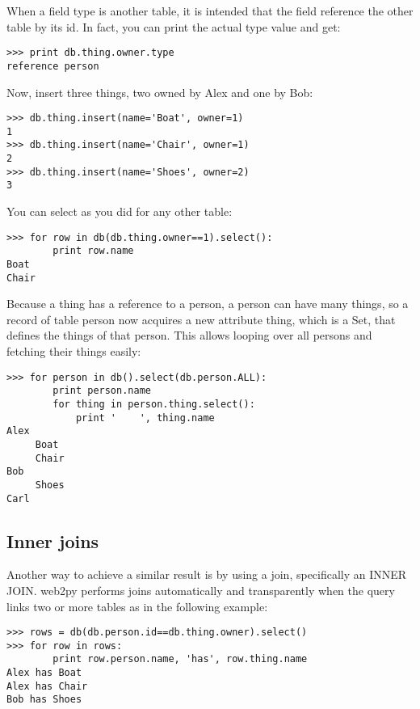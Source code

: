 \documentclass[justified,sixbynine,notoc]{tufte-book}
\def\inxx#1{\index{#1}}
\begin{document}
\begin{fullwidth}
When a field type is another table, it is intended that the field reference the other table by its id. In fact, you can print the actual type value and get:
\begin{lstlisting}
>>> print db.thing.owner.type
reference person
\end{lstlisting}

Now, insert three things, two owned by Alex and one by Bob:
\begin{lstlisting}
>>> db.thing.insert(name='Boat', owner=1)
1
>>> db.thing.insert(name='Chair', owner=1)
2
>>> db.thing.insert(name='Shoes', owner=2)
3
\end{lstlisting}

You can select as you did for any other table:
\begin{lstlisting}
>>> for row in db(db.thing.owner==1).select():
        print row.name
Boat
Chair
\end{lstlisting}

Because a thing has a reference to a person, a person can have many things, so a record of table person now acquires a new attribute thing, which is a Set, that defines the things of that person. This allows looping over all persons and fetching their things easily:

\inxx{referencing}
\begin{lstlisting}
>>> for person in db().select(db.person.ALL):
        print person.name
        for thing in person.thing.select():
            print '    ', thing.name
Alex
     Boat
     Chair
Bob
     Shoes
Carl
\end{lstlisting}

\goodbreak\subsection{Inner joins}

Another way to achieve a similar result is by using a join, specifically an INNER JOIN. web2py performs joins automatically and transparently when the query links two or more tables as in the following example:

\inxx{Rows} \inxx{inner join} \inxx{join}
\begin{lstlisting}
>>> rows = db(db.person.id==db.thing.owner).select()
>>> for row in rows:
        print row.person.name, 'has', row.thing.name
Alex has Boat
Alex has Chair
Bob has Shoes
\end{lstlisting}


\end{fullwidth}
\end{document}

